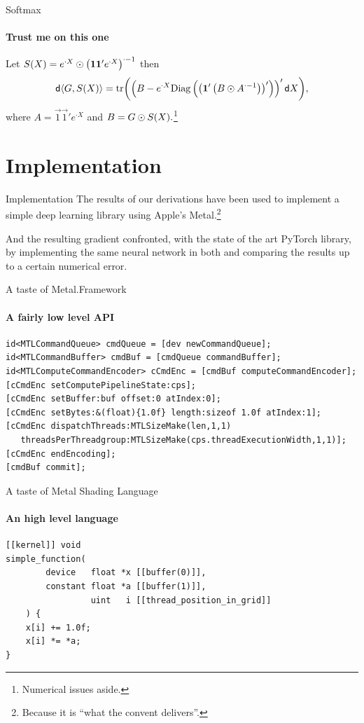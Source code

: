\documentclass[noamsthm]{beamer}
\begin{document}
\begin{frame}{Softmax}
\framesubtitle{Trust me on this one}
Let
\(S(X) = e^{{\cdot}X} \odot \left(\mathbf{1} \mathbf{1}' e^{{\cdot}X}\right)^{{\cdot}-1}\) then
\[\mathop{}\!\mathsf d\langle G,S(X)\rangle = \mathrm{tr}\!\left(
    \left(
    B - e^{{\cdot}X} \mathrm{Diag}\left(\left(\mathbf{1}' \left(B \odot A^{{\cdot}-1}\right)\right)'\right)
    \right)' \mathop{}\!\mathsf d X\right)\!,\]
where \(A = \vec 1 \vec 1' e^{{\cdot}X}\) and \(B = G \odot S(X).\)\footnote{Numerical issues aside.}
\end{frame}

\section{Implementation}

\begin{frame}{Implementation}
The results of our derivations have been used to implement a simple deep
learning library using Apple's Metal.\footnote{Because it is ``what the convent
delivers''.}

And the resulting gradient confronted, with the state of the art PyTorch
library, by implementing the same neural network in both and comparing the
results up to a certain numerical error.
\end{frame}

\begin{frame}[fragile]{A taste of Metal.Framework}
\framesubtitle{A fairly low level API}
\footnotesize
\begin{verbatim}
id<MTLCommandQueue> cmdQueue = [dev newCommandQueue];
id<MTLCommandBuffer> cmdBuf = [cmdQueue commandBuffer];
id<MTLComputeCommandEncoder> cCmdEnc = [cmdBuf computeCommandEncoder];
[cCmdEnc setComputePipelineState:cps];
[cCmdEnc setBuffer:buf offset:0 atIndex:0];
[cCmdEnc setBytes:&(float){1.0f} length:sizeof 1.0f atIndex:1];
[cCmdEnc dispatchThreads:MTLSizeMake(len,1,1)
   threadsPerThreadgroup:MTLSizeMake(cps.threadExecutionWidth,1,1)];
[cCmdEnc endEncoding];
[cmdBuf commit];
\end{verbatim}
\end{frame}

\begin{frame}[fragile]{A taste of Metal Shading Language}
\framesubtitle{An high level language}
\footnotesize
\begin{verbatim}
[[kernel]] void
simple_function(
        device   float *x [[buffer(0)]],
        constant float *a [[buffer(1)]],
                 uint   i [[thread_position_in_grid]]
    ) {
    x[i] += 1.0f;
    x[i] *= *a;
}
\end{verbatim}
\end{frame}
\end{document}
